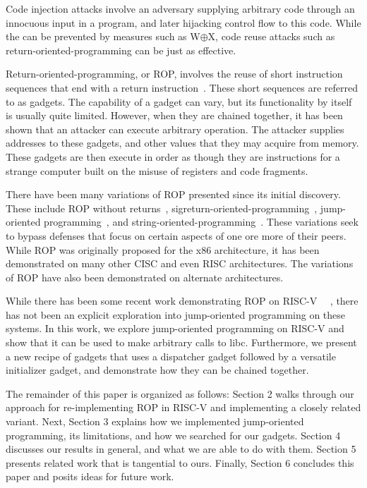 Code injection attacks involve an adversary supplying arbitrary code through an
innocuous input in a program, and later hijacking control flow to this code.
While the can be prevented by measures such as W$\oplus$X, code reuse attacks
such as return-oriented-programming can be just as effective.

Return-oriented-programming, or ROP, involves the reuse of short instruction
sequences that end with a return instruction~\cite{shacham07ropx86}. These short sequences are referred
to as gadgets. The capability of a gadget can vary, but its functionality by
itself is usually quite limited. However, when they are chained together, it has
been shown that an attacker can execute arbitrary operation. The attacker
supplies addresses to these gadgets, and other values that they may acquire from
memory. These gadgets are then execute in order as though they are instructions
for a strange computer built on the misuse of registers and code fragments.

There have been many variations of ROP presented since its initial discovery.
These include ROP without returns~\cite{checkoway10ropnoret},
sigreturn-oriented-programming~\cite{bosman14sigrop},
jump-oriented programming~\cite{bletsch11jopx86}, and string-oriented-programming~\cite{payer13sop}. These variations
seek to bypass defenses that focus on certain aspects of one ore more of their
peers. While ROP was originally proposed for the x86 architecture, it has been
demonstrated on many other CISC and even RISC architectures. The variations of
ROP have also been demonstrated on alternate architectures.

While there has been some recent work demonstrating ROP on RISC-V~%
~\cite{gu20ropriscv,jaloyan20ropriscv}, there has not been an explicit
exploration into jump-oriented programming on these systems. In this work, we
explore jump-oriented programming on RISC-V and show that it can be used to make
arbitrary calls to libc. Furthermore, we present a new recipe of gadgets that
uses a dispatcher gadget followed by a versatile initializer gadget, and
demonstrate how they can be chained together.

The remainder of this paper is organized as follows: Section 2 walks through our
approach for re-implementing ROP in RISC-V and implementing a closely related
variant. Next, Section 3 explains how we implemented jump-oriented programming,
its limitations, and how we searched for our gadgets. Section 4 discusses our
results in general, and what we are able to do with them. Section 5 presents
related work that is tangential to ours. Finally, Section 6 concludes this paper
and posits ideas for future work.

